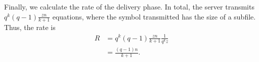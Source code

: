 \documentclass[journal,twocolumn]{IEEEtran}
\theoremstyle{definition}
\newcommand{\calS}{\mathcal{S}}
\newcommand{\bfg}{\mathbf{g}}
\newcommand{\bfc}{\mathbf{c}}
\newcommand{\bfG}{\mathbf{G}}
\begin{document}
Finally, we calculate the rate of the delivery phase. In total, the server transmits $q^k(q-1)\frac{zn}{k+1}$ equations, where the symbol transmitted has the size of a subfile. Thus, the rate is
\begin{align*}
R&=q^k(q-1)\frac{zn}{k+1}\frac{1}{q^kz}\\
&=\frac{(q-1)n}{k+1}.
\end{align*}
\endproof


%
\end{document}
